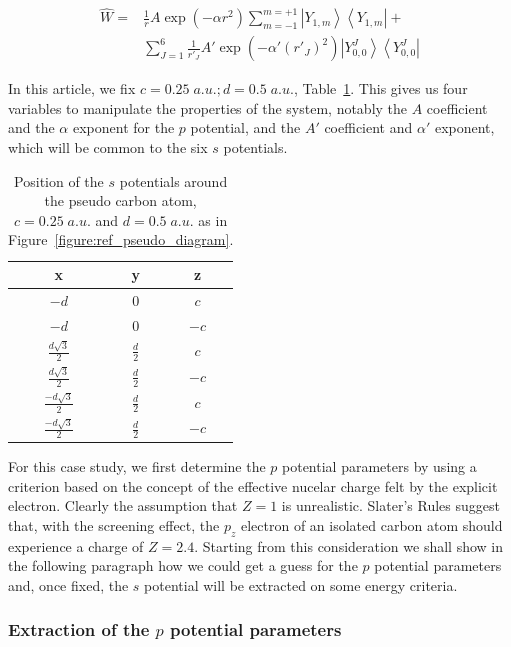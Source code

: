 \documentclass[aip,reprint]{revtex4-1}
\begin{document}
\begin{align}
\label{eq:ourPP}
\hat{W} =&
\frac{1}{r} A\exp(-\alpha r^2)\sum_{m=-1}^{m=+1}\left|Y_{1,m}\right>\left<Y_{1,m}\right|%
+\\
&\sum_{J=1}^{6} \frac{1}{r'_J} A'\exp(-\alpha' (r'_J)^2)\left|Y_{0,0}^J\right>\left<Y_{0,0}^J\right|%
\nonumber
\end{align}

In this article, we fix \(c = 0.25\;a.u.; d=0.5\;a.u.\), Table~\ref{tab:pos}.
This gives us four variables to manipulate the properties of the system, 
notably the $A$ coefficient and the $\alpha$ exponent for the $p$ potential, and
the $A'$ coefficient and $\alpha'$ exponent, which will be common to the six $s$ potentials.

\begin{table}[ht]
\caption{\label{tab:pos}Position of the $s$ potentials around the pseudo carbon atom, $c=0.25\;a.u.$ and $d=0.5\;a.u.$ as in Figure~\ref{figure:ref_pseudo_diagram}.
}
\begin{tabular}{ccc}
\hline\hline
 x & y & z                                       \\
\hline
 $-d$                   & $0$            & $ c$ \\
 $-d$                   & $0$            & $-c$ \\
 $\frac{ d\sqrt{3}}{2}$  & $\frac{d}{2}$  & $ c$ \\
 $\frac{ d\sqrt{3}}{2}$  & $\frac{d}{2}$  & $-c$ \\
 $\frac{-d\sqrt{3}}{2}$ & $\frac{d}{2}$  & $ c$ \\
 $\frac{-d\sqrt{3}}{2}$ & $\frac{d}{2}$  & $-c$ \\
\hline\hline
\end{tabular}
\end{table}

For this case study, we first determine the $p$ potential parameters by using a criterion based 
on the concept of the effective nucelar charge felt by the explicit electron.
Clearly the assumption that \(Z = 1\) is unrealistic.
Slater's Rules\cite{slatersrules} suggest that, with the screening effect, the \(p_{z}\)
electron of an isolated carbon atom should experience a charge of \(Z = 2.4\). Starting
from this consideration we shall show in the following paragraph how we could get
a guess for the  $p$ potential parameters and, once fixed,
the $s$ potential will be extracted on some energy criteria.


\subsubsection{Extraction of the $p$ potential parameters}
\end{document}
